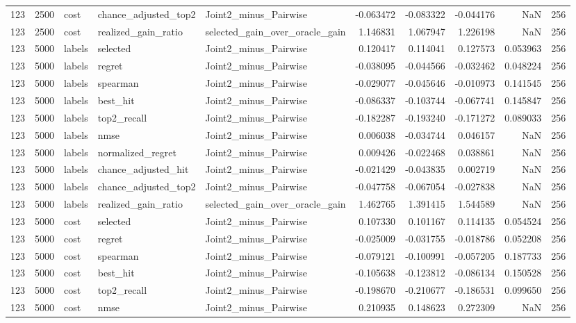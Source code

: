 \begin{tabular}{rrlllrrrrr}
123 & 2500 & cost & chance_adjusted_top2 & Joint2_minus_Pairwise & -0.063472 & -0.083322 & -0.044176 & NaN & 256 \\
123 & 2500 & cost & realized_gain_ratio & selected_gain_over_oracle_gain & 1.146831 & 1.067947 & 1.226198 & NaN & 256 \\
123 & 5000 & labels & selected & Joint2_minus_Pairwise & 0.120417 & 0.114041 & 0.127573 & 0.053963 & 256 \\
123 & 5000 & labels & regret & Joint2_minus_Pairwise & -0.038095 & -0.044566 & -0.032462 & 0.048224 & 256 \\
123 & 5000 & labels & spearman & Joint2_minus_Pairwise & -0.029077 & -0.045646 & -0.010973 & 0.141545 & 256 \\
123 & 5000 & labels & best_hit & Joint2_minus_Pairwise & -0.086337 & -0.103744 & -0.067741 & 0.145847 & 256 \\
123 & 5000 & labels & top2_recall & Joint2_minus_Pairwise & -0.182287 & -0.193240 & -0.171272 & 0.089033 & 256 \\
123 & 5000 & labels & nmse & Joint2_minus_Pairwise & 0.006038 & -0.034744 & 0.046157 & NaN & 256 \\
123 & 5000 & labels & normalized_regret & Joint2_minus_Pairwise & 0.009426 & -0.022468 & 0.038861 & NaN & 256 \\
123 & 5000 & labels & chance_adjusted_hit & Joint2_minus_Pairwise & -0.021429 & -0.043835 & 0.002719 & NaN & 256 \\
123 & 5000 & labels & chance_adjusted_top2 & Joint2_minus_Pairwise & -0.047758 & -0.067054 & -0.027838 & NaN & 256 \\
123 & 5000 & labels & realized_gain_ratio & selected_gain_over_oracle_gain & 1.462765 & 1.391415 & 1.544589 & NaN & 256 \\
123 & 5000 & cost & selected & Joint2_minus_Pairwise & 0.107330 & 0.101167 & 0.114135 & 0.054524 & 256 \\
123 & 5000 & cost & regret & Joint2_minus_Pairwise & -0.025009 & -0.031755 & -0.018786 & 0.052208 & 256 \\
123 & 5000 & cost & spearman & Joint2_minus_Pairwise & -0.079121 & -0.100991 & -0.057205 & 0.187733 & 256 \\
123 & 5000 & cost & best_hit & Joint2_minus_Pairwise & -0.105638 & -0.123812 & -0.086134 & 0.150528 & 256 \\
123 & 5000 & cost & top2_recall & Joint2_minus_Pairwise & -0.198670 & -0.210677 & -0.186531 & 0.099650 & 256 \\
123 & 5000 & cost & nmse & Joint2_minus_Pairwise & 0.210935 & 0.148623 & 0.272309 & NaN & 256 \\

\end{tabular}
